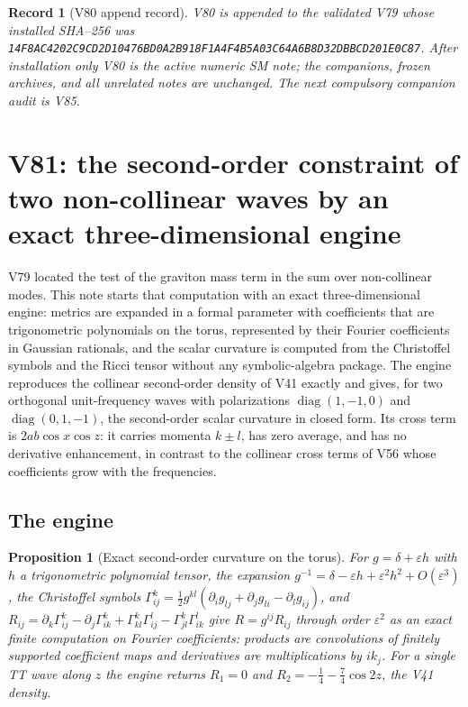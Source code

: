 \documentclass[11pt]{article}
\newtheorem{proposition}[theorem]{Proposition}
\newtheorem{record}[theorem]{Record}
\theoremstyle{remark}
\begin{document}
\begin{record}[V80 append record]
\label{rec:v19v80}
V80 is appended to the validated V79 whose installed SHA--256 was
\texttt{14F8AC4202C9CD2D10476BD0A2B918F1A4F4B5A03C64A6B8D32DBBCD201E0C87}.
After installation only V80 is the active numeric SM note; the
companions, frozen archives, and all unrelated notes are unchanged.  The
next compulsory companion audit is V85.
\end{record}


\section{V81: the second-order constraint of two non-collinear waves by an exact three-dimensional engine}
\label{sec:v19v81}

V79 located the test of the graviton mass term in the sum over
non-collinear modes.  This note starts that computation with an exact
three-dimensional engine: metrics are expanded in a formal parameter
with coefficients that are trigonometric polynomials on the torus,
represented by their Fourier coefficients in Gaussian rationals, and
the scalar curvature is computed from the Christoffel symbols and the
Ricci tensor without any symbolic-algebra package.  The engine
reproduces the collinear second-order density of V41 exactly and gives,
for two orthogonal unit-frequency waves with polarizations
\(\operatorname{diag}(1,-1,0)\) and \(\operatorname{diag}(0,1,-1)\), the
second-order scalar curvature in closed form.  Its cross term is
\(2ab\cos x\cos z\): it carries momenta \(k\pm l\), has zero average, and
has no derivative enhancement, in contrast to the collinear cross terms
of V56 whose coefficients grow with the frequencies.

\subsection{The engine}

\begin{proposition}[Exact second-order curvature on the torus]
\label{prop:v19v81-engine}
For \(g=\delta+\varepsilon h\) with \(h\) a trigonometric polynomial
tensor, the expansion \(g^{-1}=\delta-\varepsilon h+\varepsilon^2h^2+O(\varepsilon^3)\),
the Christoffel symbols
\(\Gamma^k_{ij}=\tfrac12g^{kl}(\partial_ig_{lj}+\partial_jg_{li}-\partial_lg_{ij})\),
and \(R_{ij}=\partial_k\Gamma^k_{ij}-\partial_j\Gamma^k_{ik}+\Gamma^k_{kl}\Gamma^l_{ij}-\Gamma^k_{jl}\Gamma^l_{ik}\)
give \(R=g^{ij}R_{ij}\) through order \(\varepsilon^2\) as an exact
finite computation on Fourier coefficients: products are convolutions
of finitely supported coefficient maps and derivatives are
multiplications by \(ik_j\).  For a single TT wave along \(z\) the
engine returns \(R_1=0\) and \(R_2=-\tfrac14-\tfrac74\cos2z\), the
V41 density.
\end{proposition}
\end{document}
